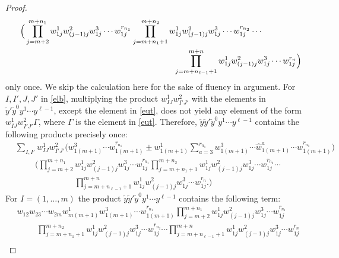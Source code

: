\documentclass[12pt,oneside,reqno]{amsart}
\theoremstyle{plain}
\theoremstyle{definition}
\theoremstyle{remark}
\begin{document}
\begin{proof}
\begin{equation}
\begin{split}
&\hspace{.5cm} \Big{(} \prod^{m+n_1}_{j=m+2} w^1_{1j} w^2_{(j-1)j} w^3_{1j} \cdots w^{r_{n_1}}_{1j} \prod^{m+n_2}_{j=m+ n_1 +1} w^1_{1j} w^2_{(j-1)j} w^3_{1j} \cdots w^{r_{n_2}}_{1j} \cdots \\
& \hspace{7cm} \prod^{m+n}_{j=m+n_{\ell-1} +1} w^1_{1j} w^2_{(j-1)j} w^3_{1j} \cdots w^{r_{n}}_{1j}\Big{)}
\end{split}
\end{equation}
only once. We skip the calculation here for the sake of fluency in argument. %
For $I, I' , J, J'$ in \eqref{elb}, multiplying the product $w^1_{IJ} w^2_{I'J'}$ with the elements in $\tilde{y}' \tilde{y}^0 y^1 \cdots y^{\ell-1}$, except the element in \eqref{eut}, does not yield any element of the form $w^1_{IJ} w^2_{I'J'} \Gamma$, where $\Gamma$ is the element in \eqref{eut}.
Therefore, $\tilde{y}\tilde{y}' \tilde{y}^0 y^1 \cdots y^{\ell-1}$ contains the following products precisely once:
\begin{equation*} 
\begin{split}
&\sum_{I,I'} w^1_{IJ} w^2_{I'J'} \Big(w^3_{1(m+1)} \cdots w^{r_{n_1}}_{1(m+1)} \pm w^1_{1(m+1)} \sum^{r_{n_1}}_{a=3} w^3_{1(m+1)} \cdots \hat{w}^a_{1(m+1)} \cdots w^{r_{n_1}}_{1(m+1)}\Big)
\\
& \hspace{1cm} \Big( \prod^{m+n_1}_{j=m+2} w^1_{1j} w^2_{(j-1)j} w^3_{1j} \cdots w^{r_{n_1}}_{1j} \prod^{m+n_2}_{j=m+ n_1 +1} w^1_{1j} w^2_{(j-1)j} w^3_{1j} \cdots w^{r_{n_2}}_{1j} \cdots
\\ & \hspace{3cm} \prod^{m+n}_{j=m+n_{\ell-1} +1} w^1_{1j} w^2_{(j-1)j} w^3_{1j} \cdots w^{r_{n}}_{1j}. \Big)
\end{split}
\end{equation*}
For $I = (1,\ldots, m)$ the product $\tilde{y}\tilde{y}' \tilde{y}^0 y^1 \cdots y^{\ell-1}$ contains the following term:
\begin{align*}
& w_{12} w_{23} \cdots w_{2m} w^1_{m(m+1)} w^3_{1(m+1)} \cdots w^{r_{n_1}}_{1(m+1)} \prod^{m+n_1}_{j=m+2} w^1_{1j} w^2_{(j-1)j} w^3_{1j} \cdots w^{r_{n_1}}_{1j}\\
&\hspace{1cm} \prod^{m+n_2}_{j=m+ n_1 +1} w^1_{1j} w^2_{(j-1)j} w^3_{1j} \cdots w^{r_{n_2}}_{1j} \cdots \prod^{m+n}_{j=m+n_{\ell-1} +1} w^1_{1j} w^2_{(j-1)j} w^3_{1j} \cdots w^{r_{n}}_{1j}\\

\end{align*}
\end{proof}
\end{document}
